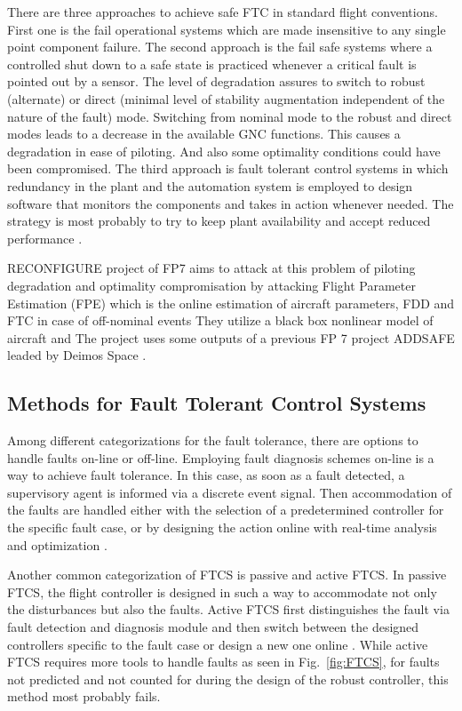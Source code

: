 There are three approaches to achieve safe FTC in standard flight conventions. 
First one is the fail operational systems which are made insensitive to any single 
point component failure. The second approach is the fail safe systems where a 
controlled shut down to a safe state is practiced whenever a critical fault is pointed 
out by a sensor. The level of degradation assures to switch to robust (alternate) or 
direct (minimal level of stability augmentation independent of the nature of the fault) mode. 
Switching from nominal mode to the robust and direct modes leads to a decrease 
in the available GNC functions. This causes a degradation in ease of piloting. And 
also some optimality conditions could have been compromised. The third approach 
is fault tolerant control systems in which redundancy in the plant and the automation 
system is employed to design software that monitors the components and takes in 
action whenever needed. The strategy is most probably to try to keep plant availability 
and accept reduced performance \cite{blanke2000fault}.

RECONFIGURE project of FP7 \cite{goupil2015overview} aims to attack at this 
problem of piloting degradation and optimality compromisation by attacking 
Flight Parameter Estimation (FPE) which is the online estimation of aircraft parameters, 
FDD and FTC in case of off-nominal events \cite{RECONFIGURE} They utilize a black 
box nonlinear model of aircraft and The project uses some outputs of a previous FP 7 
project ADDSAFE leaded by Deimos Space \cite{ADDSAFE}.

\subsection{Methods for Fault Tolerant Control Systems}\label{ch1:methodsFTCS}

Among different categorizations for the fault tolerance, there are options to handle 
faults on-line or off-line. Employing fault diagnosis schemes on-line is a way to 
achieve fault tolerance. In this case, as soon as a fault detected, a supervisory 
agent is informed via a discrete event signal. Then accommodation of the faults 
are handled either with the selection of a predetermined controller for the specific 
fault case, or by designing the action online with real-time analysis and optimization \cite{blanke2000fault}.

Another common categorization of FTCS is passive and active FTCS. In passive FTCS, 
the flight controller is designed in such a way to accommodate not only the 
disturbances but also the faults. Active FTCS first distinguishes the fault via fault detection 
and diagnosis module and then switch between the designed controllers specific to the 
fault case or design a new one online \cite{angelov2012sense}. While active FTCS 
requires more tools to handle faults as seen in Fig.~\ref{fig:FTCS}, for faults 
not predicted and not counted for during the design of the robust controller, this method 
most probably fails. 

